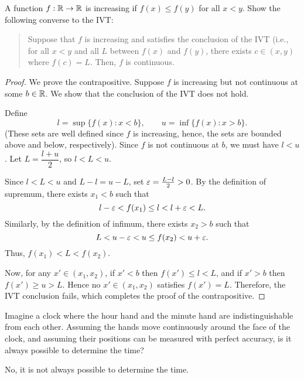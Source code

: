 \begin{problem}
  A function $f : \mathbb{R} \to \mathbb{R}$ is increasing if $f(x) \leq f(y)$ for all $x < y$. Show the following converse to the IVT:

  \begin{quote}
    Suppose that $f$ is increasing and satisfies the conclusion of the IVT
    (i.e., for all $x < y$ and all $L$ between $f(x)$ and $f(y)$, there exists
    $c \in (x, y)$ where $f(c) = L$. Then, $f$ is continuous.
  \end{quote}

  \begin{proof}
    We prove the contrapositive. Suppose $f$ is increasing but not continuous
    at some $b \in \mathbb{R}$. We show that the conclusion of the IVT does not hold.

    Define
    \[
      l = \sup \{ f(x) : x < b \}, \qquad u = \inf \{ f(x) : x > b \}.
    \]
    (These sets are well defined since $f$ is increasing, hence, the sets are
    bounded above and below, respectively).
    Since $f$ is not continuous at $b$, we must have $l<u$.
    Let $L = \dfrac{l+u}{2}$, so $l < L < u$.

    Since $l < L < u$ and $L - l = u - L$, set $\varepsilon = \frac{L - l}{2} > 0$.
    By the definition of supremum, there exists $x_{1} < b$ such that
    \[
      l - \varepsilon < f(x_{1}) \le l < l + \varepsilon < L.
    \]
    Similarly, by the definition of infimum, there exists $x_{2} > b$ such that
    \[
      L < u - \varepsilon < u \leq f(x_{2}) < u + \varepsilon.
    \]
    Thus, $f(x_{1}) < L < f(x_{2})$.

    Now, for any $x'\in(x_{1},x_{2})$, if $x' < b$ then $f(x') \leq l < L$, and if
    $x' > b$ then $f(x') \geq u>L$. Hence no $x' \in (x_{1}, x_{2})$ satisfies
    $f(x') = L$.
    Therefore, the IVT conclusion fails, which completes the proof of the contrapositive.
  \end{proof}

\end{problem}

\begin{problem}
  Imagine a clock where the hour hand and the minute hand are indistinguishable
  from each other. Assuming the hands move continuously around the face of the
  clock, and assuming their positions can be measured with perfect accuracy, is
  it always possible to determine the time?

  \vspace{\baselineskip}

  No, it is not always possible to determine the time.
\end{problem}
